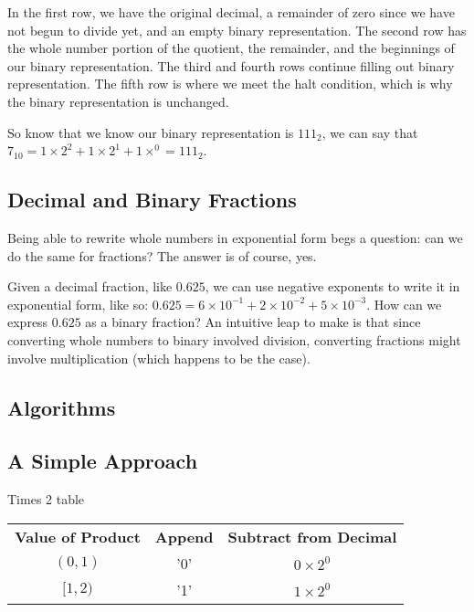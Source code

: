 \documentclass[12pt]{article}
\begin{document}
\par In the first row, we have the original decimal, a remainder of zero since we have not begun to divide yet, and an empty binary representation. The second row has the whole number portion of the quotient, the remainder, and the beginnings of our binary representation. The third and fourth rows continue filling out binary representation. The fifth row is where we meet the halt condition, which is why the binary representation is unchanged.

\par So know that we know our binary representation is $111_2$, we can say that $7_{10} = 1\times2^2+1\times2^1+1\times^0 = 111_2$.

\subsection{Decimal and Binary Fractions}
Being able to rewrite whole numbers in exponential form begs a question: can we do the same for fractions? The answer is of course, yes.

\par Given a decimal fraction, like $0.625$, we can use negative exponents to write it in exponential form, like so: $0.625 = 6\times10^{-1}+2\times10^{-2}+5\times10^{-3}$. How can we express $0.625$ as a binary fraction? An intuitive leap to make is that since converting whole numbers to binary involved division, converting fractions might involve multiplication (which happens to be the case).

\par



\newpage %



\begin{center}
\section{Algorithms}
\end{center}
\subsection{A Simple Approach}
Times 2 table
\begin{center}
\begin{tabular}{c|c|c}
    \textbf{Value of Product} & \textbf{Append} & \textbf{Subtract from Decimal} \\
    $(0,1)$   & '0' & $0\times2^0$ \\
    $[1,2)$   & '1' & $1\times2^0$
\end{tabular}
\end{center}
\end{document}
